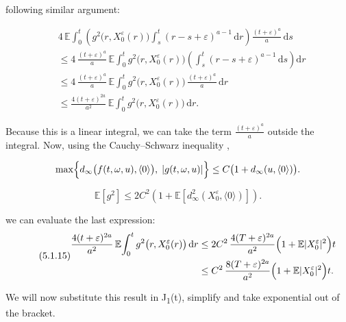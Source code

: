 \documentclass[12pt,a4paper]{report}
\numberwithin{equation}{section}
\begin{document}
following similar argument: 

\begin{equation}\tag{5.1.14}\label{eq:5.1.14}
\begin{aligned}
&4\,\mathbb{E}\!\int_{0}^{t}
\left(g^{2}\bigl(r,X_{0}^{\varepsilon}(r)\bigr)\int_{s}^{t}(r-s+\varepsilon)^{a-1}\,\mathrm{d}r\right)
\frac{(t+\varepsilon)^{a}}{a}\,\mathrm{d}s \\
&\le 4\,\frac{(t+\varepsilon)^{a}}{a}\,
\mathbb{E}\!\int_{0}^{t} g^{2}\bigl(r,X_{0}^{\varepsilon}(r)\bigr)
\left(\int_{s}^{t}(r-s+\varepsilon)^{a-1}\,\mathrm{d}s\right)\mathrm{d}r \\
&\le 4\,\frac{(t+\varepsilon)^{a}}{a}\,
\mathbb{E}\!\int_{0}^{t} g^{2}\bigl(r,X_{0}^{\varepsilon}(r)\bigr)\,
\frac{(t+\varepsilon)^{a}}{a}\,\mathrm{d}r \\
&\le \frac{4(t+\varepsilon)^{2a}}{a^{2}}\,
\mathbb{E}\!\int_{0}^{t} g^{2}\bigl(r,X_{0}^{\varepsilon}(r)\bigr)\,\mathrm{d}r .
\end{aligned}
\end{equation}

Because this is a linear integral, we can take the term
\(\frac{(t + \varepsilon)^{a}}{a}\) outside the integral. Now, using the
Cauchy--Schwarz inequality \cite{llendeto2007modeling_82},

\[
\max\Bigl\{
d_{\infty}\bigl(f(t,\omega,u),\langle 0\rangle\bigr),\;
\lvert g(t,\omega,u)\rvert
\Bigr\}
\le C\bigl(1+d_{\infty}(u,\langle 0\rangle)\bigr).
\]

\[
\mathbb{E}\!\left[g^{2}\right]
\le 2C^{2}\left(1+\mathbb{E}\!\left[d_{\infty}^{2}\!\left(X_{0}^{\varepsilon},\langle 0\rangle\right)\right]\right).
\]


we can evaluate the last expression:
\begin{equation}\tag{5.1.15}\label{eq:5.1.15}
\begin{aligned}
\frac{4(t+\varepsilon)^{2a}}{a^{2}}\,
\mathbb{E}\!\int_{0}^{t} g^{2}\bigl(r,X_{0}^{\varepsilon}(r)\bigr)\,\mathrm{d}r
&\le 2C^{2}\,\frac{4(T+\varepsilon)^{2a}}{a^{2}}
\Bigl(1+\mathbb{E}\lvert X_{0}^{\varepsilon}\rvert^{2}\Bigr)t \\
&\le C^{2}\,\frac{8(T+\varepsilon)^{2a}}{a^{2}}
\Bigl(1+\mathbb{E}\lvert X_{0}^{\varepsilon}\rvert^{2}\Bigr)t .
\end{aligned}
\end{equation}


We will now substitute this result in J\textsubscript{1}(t), simplify
and take exponential out of the bracket.
\end{document}
